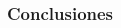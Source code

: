 \documentclass[14pt]{beamer}
\begin{document}
\begin{frame}
\frametitle{Conclusiones}
\begin{itemize}
\begin{columns}
\begin{column}{0.5\textwidth}

\begin{center}


\end{center}
\end{column}
\end{columns}
\end{itemize}
\end{frame}
\end{document}
